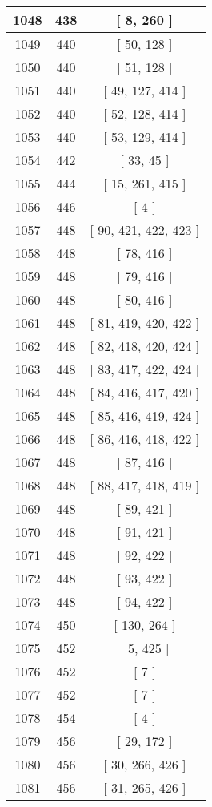 \begin{center}
\begin{longtable}[H]{|| c c c ||}
\hline
1048 & 438 & [ 8, 260 ] \\ 
\hline
1049 & 440 & [ 50, 128 ] \\ 
\hline
1050 & 440 & [ 51, 128 ] \\ 
\hline
1051 & 440 & [ 49, 127, 414 ] \\ 
\hline
1052 & 440 & [ 52, 128, 414 ] \\ 
\hline
1053 & 440 & [ 53, 129, 414 ] \\ 
\hline
1054 & 442 & [ 33, 45 ] \\ 
\hline
1055 & 444 & [ 15, 261, 415 ] \\ 
\hline
1056 & 446 & [ 4 ] \\ 
\hline
1057 & 448 & [ 90, 421, 422, 423 ] \\ 
\hline
1058 & 448 & [ 78, 416 ] \\ 
\hline
1059 & 448 & [ 79, 416 ] \\ 
\hline
1060 & 448 & [ 80, 416 ] \\ 
\hline
1061 & 448 & [ 81, 419, 420, 422 ] \\ 
\hline
1062 & 448 & [ 82, 418, 420, 424 ] \\ 
\hline
1063 & 448 & [ 83, 417, 422, 424 ] \\ 
\hline
1064 & 448 & [ 84, 416, 417, 420 ] \\ 
\hline
1065 & 448 & [ 85, 416, 419, 424 ] \\ 
\hline
1066 & 448 & [ 86, 416, 418, 422 ] \\ 
\hline
1067 & 448 & [ 87, 416 ] \\ 
\hline
1068 & 448 & [ 88, 417, 418, 419 ] \\ 
\hline
1069 & 448 & [ 89, 421 ] \\ 
\hline
1070 & 448 & [ 91, 421 ] \\ 
\hline
1071 & 448 & [ 92, 422 ] \\ 
\hline
1072 & 448 & [ 93, 422 ] \\ 
\hline
1073 & 448 & [ 94, 422 ] \\ 
\hline
1074 & 450 & [ 130, 264 ] \\ 
\hline
1075 & 452 & [ 5, 425 ] \\ 
\hline
1076 & 452 & [ 7 ] \\ 
\hline
1077 & 452 & [ 7 ] \\ 
\hline
1078 & 454 & [ 4 ] \\ 
\hline
1079 & 456 & [ 29, 172 ] \\ 
\hline
1080 & 456 & [ 30, 266, 426 ] \\ 
\hline
1081 & 456 & [ 31, 265, 426 ] \\ 

\end{longtable}
\end{center}
